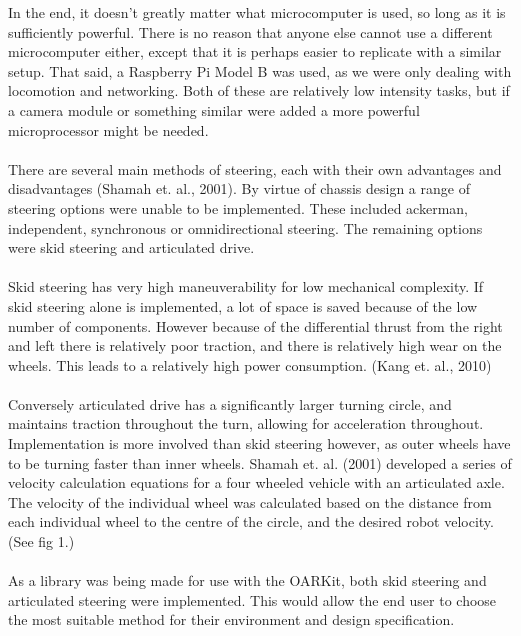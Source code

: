 \documentclass[]{article}
\begin{document}
In the end, it doesn't greatly matter what microcomputer is used, so long as it is sufficiently powerful. There is no reason that anyone else cannot use a different microcomputer either, except that it is perhaps easier to replicate with a similar setup. That said, a Raspberry Pi Model B was used, as we were only dealing with locomotion and networking. Both of these are relatively low intensity tasks, but if a camera module or something similar were added a more powerful microprocessor might be needed.
\\
\\
There are several main methods of steering, each with their own advantages and disadvantages (Shamah et. al., 2001). By virtue of chassis design a range of steering options were unable to be implemented. These included ackerman, independent, synchronous or omnidirectional steering. The remaining options were skid steering and articulated drive.
\\
\\
Skid steering has very high maneuverability for low mechanical complexity. If skid steering alone is implemented, a lot of space is saved because of the low number of components. However because of the differential thrust from the right and left there is relatively poor traction, and there is relatively high wear on the wheels. This leads to a relatively high power consumption. (Kang et. al., 2010)
\\
\\
Conversely articulated drive has a significantly larger turning circle, and  maintains traction throughout the turn, allowing for acceleration throughout. Implementation is more involved than skid steering however, as outer wheels have to be turning faster than inner wheels. Shamah et. al. (2001) developed a series of velocity calculation equations for a four wheeled vehicle with an articulated axle. The velocity of the individual wheel was calculated based on the distance from each individual wheel to the centre of the circle, and the desired robot velocity. (See fig 1.)
\\
\\
As a library was being made for use with the OARKit, both skid steering and articulated steering were implemented. This would allow the end user to choose the most suitable method for their environment and design specification.
\\
\\
\end{document}
